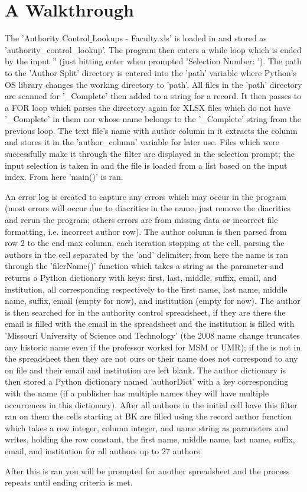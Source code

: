 \documentclass{article}
\begin{document}
\section{A Walkthrough}
	\begin{adjustwidth}{3em}{}
		The 'Authority Control\underline{ }Lookups - Faculty.xls' is loaded in and stored as 'authority\_control\_lookup'. The program then enters a while loop which is ended by the input '' (just hitting enter when prompted 'Selection Number: '). The path to the 'Author Split' directory is entered into the 'path' variable where Python's OS library changes the working directory to 'path'. All files in the 'path' directory are scanned for '\_Complete' then added to a string for a record. It then passes to a FOR loop which parses the directory again for XLSX files which do not have '\_Complete' in them nor whose name belongs to the '\_Complete' string from the previous loop. The text file's name with author column in it extracts the column and stores it in the 'author\_column' variable for later use. Files which were successfully make it through the filter are displayed in the selection prompt; the input selection is taken in and the file is loaded from a list based on the input index. From here 'main()' is ran.\par
        An error log is created to capture any errors which may occur in the program (most errors will occur due to diacritics in the name, just remove the diacritics and rerun the program; others errors are from missing data or incorrect file formatting, i.e. incorrect author row). The author column is then parsed from row 2 to the end max column, each iteration stopping at the cell, parsing the authors in the cell separated by the 'and' delimiter; from here the name is ran through the 'filerName()' function which takes a string as the parameter and returns a Python dictionary with keys: first, last, middle, suffix, email, and institution, all corresponding respectively to the first name, last name, middle name, suffix, email (empty for now), and institution (empty for now). The author is then searched for in the authority control spreadsheet, if they are there the email is filled with the email in the spreadsheet and the institution is filled with 'Missouri University of Science and Technology' (the 2008 name change truncates any historic name even if the professor worked for MSM or UMR); if the is not in the spreadsheet then they are not ours or their name does not correspond to any on file and their email and institution are left blank. The author dictionary is then stored a Python dictionary named 'authorDict' with a key corresponding with the name (if a publisher has multiple names they will have multiple occurrences in this dictionary). After all authors in the initial cell have this filter ran on them the cells starting at BK are filled using the record author function which takes a row integer, column integer, and name string as parameters and writes, holding the row constant, the first name, middle name, last name, suffix, email, and institution for all authors up to 27 authors.\par
        After this is ran you will be prompted for another spreadsheet and the process repeats until ending criteria is met.
	\end{adjustwidth}
    
    
\end{document}
